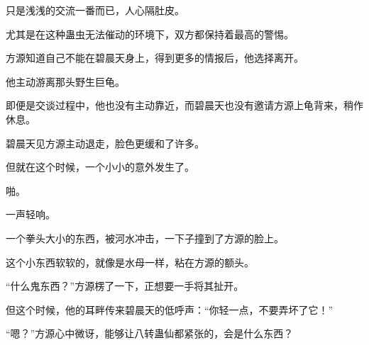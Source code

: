 \begin{this_body}
只是浅浅的交流一番而已，人心隔肚皮。

尤其是在这种蛊虫无法催动的环境下，双方都保持着最高的警惕。

方源知道自己不能在碧晨天身上，得到更多的情报后，他选择离开。

他主动游离那头野生巨龟。

即便是交谈过程中，他也没有主动靠近，而碧晨天也没有邀请方源上龟背来，稍作休息。

碧晨天见方源主动退走，脸色更缓和了许多。

但就在这个时候，一个小小的意外发生了。

啪。

一声轻响。

一个拳头大小的东西，被河水冲击，一下子撞到了方源的脸上。

这个小东西软软的，就像是水母一样，粘在方源的额头。

“什么鬼东西？”方源楞了一下，正想要一手将其扯开。

但这个时候，他的耳畔传来碧晨天的低呼声：“你轻一点，不要弄坏了它！”

“嗯？”方源心中微讶，能够让八转蛊仙都紧张的，会是什么东西？

\end{this_body}

